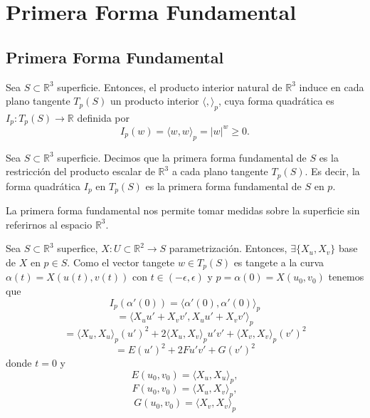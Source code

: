 \chapter{Primera Forma Fundamental}

\section{Primera Forma Fundamental}

\begin{prop}
  Sea $S \subset \mathbb{R}^{3}$ superficie. Entonces, el producto interior natural de $\mathbb{R}^{3}$ induce en cada plano tangente $T_{p}(S)$ un producto interior $\langle  { , } \rangle_{p}$, cuya forma quadrática es $I_{p} : T_{p}(S) \to \mathbb{R}$ definida por
  \[ 
    I_{p}(w) = \langle w{ , }w \rangle_{p} = | w |^{w} \geq 0.
  \] 
\end{prop}

\begin{defn}
  Sea $S \subset \mathbb{R}^{3}$ superficie. Decimos que la primera forma fundamental de $S$ es la restricción del producto escalar de $\mathbb{R}^{3}$ a cada plano tangente $T_{p}(S)$. Es decir, la forma quadrática $I_{p}$ en $T_{p}(S)$ es la primera forma fundamental de $S$ en $p$.
\end{defn}

\begin{obs}
  La primera forma fundamental nos permite tomar medidas sobre la superficie sin referirnos al espacio $\mathbb{R}^{3}$.
\end{obs}

\begin{note}
  Sea $S \subset \mathbb{R}^{3}$ superfice, $X : U \subset \mathbb{R}^{2} \to S$ parametrización. Entonces, $\exists \{ X_{u}, X_{v} \}$ base de $X$ en $p \in S$. Como el vector tangete $w \in T_{p}(S)$ es tangete a la curva $\alpha(t) = X(u(t), v(t))$ con $t \in (-\epsilon, \epsilon)$ y $p = \alpha(0) = X(u_{0}, v_{0})$ tenemos que
  \[ 
    I_{p}(\alpha'(0)) = \langle \alpha'(0){ , }\alpha'(0) \rangle_{p}
  \] 
  \[ 
    = \langle X_{u}u' + X_{v}v'{ , } X_{u}u' + X_{v}v' \rangle_{p}
  \] 
  \[ 
    = \langle X_{u}{ , }X_{u} \rangle_{p}(u')^{2} + 2 \langle X_{u}{ , }X_{v} \rangle_{p} u' v' + \langle X_{v}{ , }X_{v} \rangle_{p}(v')^{2} 
  \]
  \[ 
    = E(u')^{2} + 2 F u' v' + G(v')^{2} 
  \] 
  donde $t = 0$ y 
  \[ 
    E(u_{0}, v_{0}) = \langle X_{u}{ , }X_{u} \rangle_{p},
  \] 
  \[ 
    F(u_{0}, v_{0}) = \langle X_{u}{ , }X_{v} \rangle_{p}, 
  \] 
  \[ 
    G(u_{0}, v_{0}) = \langle X_{v}{ , }X_{v} \rangle_{p} 
  \] 
\end{note}

